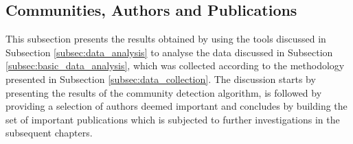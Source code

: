 \documentclass[11pt,a4paper]{book}
\theoremstyle{definition}
\theoremstyle{definition}
\theoremstyle{definition}
\theoremstyle{remark}
\newcommand{\pgraph}{\mathcal{G}_{p}}
\newcommand{\agraph}{\mathcal{G}_{a}}
\begin{document}
\subsection{Communities, Authors and Publications}
\label{subsec:communities_authors_publications}
This subsection presents the results obtained by using the tools discussed in Subsection \ref{subsec:data_analysis} to analyse the data discussed in Subsection \ref{subsec:basic_data_analysis}, which was collected according to the methodology presented in Subsection \ref{subsec:data_collection}.
The discussion starts by presenting the results of the community detection algorithm, is followed by providing a selection of authors deemed important and concludes by building the set of important publications which is subjected to further investigations in the subsequent chapters.
%
\end{document}
